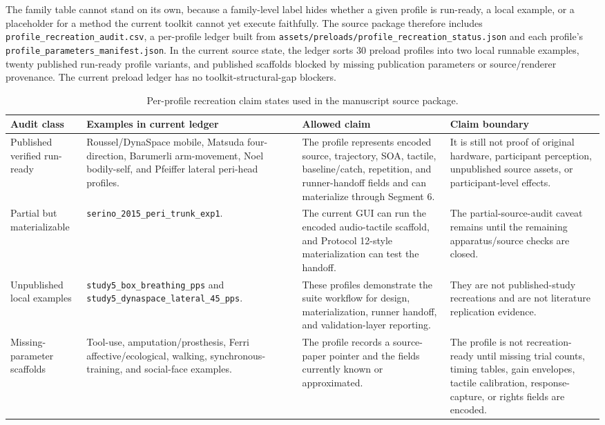 \documentclass[pdflatex,sn-apa]{sn-jnl}
\newcommand{\code}[1]{\texttt{#1}}
\begin{document}
The family table cannot stand on its own, because a family-level label hides whether a given profile is run-ready, a local example, or a placeholder for a method the current toolkit cannot yet execute faithfully. The source package therefore includes \code{profile\_recreation\_audit.csv}, a per-profile ledger built from \code{assets/preloads/profile\_recreation\_status.json} and each profile's \code{profile\_parameters\_manifest.json}. In the current source state, the ledger sorts 30 preload profiles into two local runnable examples, twenty published run-ready profile variants, and published scaffolds blocked by missing publication parameters or source/renderer provenance. The current preload ledger has no toolkit-structural-gap blockers.

\begin{table}[t]
\caption{Per-profile recreation claim states used in the manuscript source package.}
\label{tab:profile-recreation-audit}
\footnotesize
\begin{tabularx}{\textwidth}{>{\raggedright\arraybackslash}p{} >{\raggedright\arraybackslash}p{} >{\raggedright\arraybackslash}X >{\raggedright\arraybackslash}p{}}
\toprule
Audit class & Examples in current ledger & Allowed claim & Claim boundary \\
\midrule
Published verified run-ready & Roussel/DynaSpace mobile, Matsuda four-direction, Barumerli arm-movement, Noel bodily-self, and Pfeiffer lateral peri-head profiles. & The profile represents encoded source, trajectory, SOA, tactile, baseline/catch, repetition, and runner-handoff fields and can materialize through Segment 6. & It is still not proof of original hardware, participant perception, unpublished source assets, or participant-level effects. \\
Partial but materializable & \code{serino\_2015\_peri\_trunk\_exp1}. & The current GUI can run the encoded audio-tactile scaffold, and Protocol 12-style materialization can test the handoff. & The partial-source-audit caveat remains until the remaining apparatus/source checks are closed. \\
Unpublished local examples & \code{study5\_box\_breathing\_pps} and \code{study5\_dynaspace\_lateral\_45\_pps}. & These profiles demonstrate the suite workflow for design, materialization, runner handoff, and validation-layer reporting. & They are not published-study recreations and are not literature replication evidence. \\
Missing-parameter scaffolds & Tool-use, amputation/prosthesis, Ferri affective/ecological, walking, synchronous-training, and social-face examples. & The profile records a source-paper pointer and the fields currently known or approximated. & The profile is not recreation-ready until missing trial counts, timing tables, gain envelopes, tactile calibration, response-capture, or rights fields are encoded. \\

\end{tabularx}
\end{table}
\end{document}
